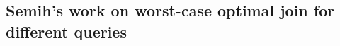 



\subsection{Semih's work on worst-case optimal join for different queries}\label{subsec:wcoj-binary-joins}







